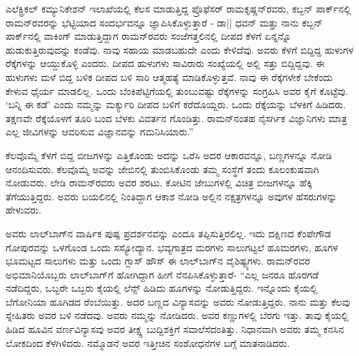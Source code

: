 ಎಲೆಕ್ಟ್ರಿಕಲ್ ಕಮ್ಯುನಿಕೇಶನ್ ಇಲಾಖೆಯಲ್ಲಿ ಕೆಲಸ ಮಾಡುತ್ತಿದ್ದ ಪ್ರೊಫೆಸರ್ ರಾಮಕೃಷ್ಣನ್‌ರವರು, ಕಬ್ಬನ್ ಪಾರ್ಕ್‌ನಲ್ಲಿ ರಾಮನ್‌ರವರನ್ನು ಭೆಟ್ಟಿಯಾದ ಸಂದರ್ಭವನ್ನೂ ಜ್ಞಾಪಿಸಿಕೊಳ್ಳುತ್ತಾರೆ - ಡಾ|| ಧವನ್ ಮತ್ತು ನಾನು ಕಬ್ಬನ್ ಪಾರ್ಕ್‌ನಲ್ಲಿ ವಾಕಿಂಗ್ ಮಾಡುತ್ತಿದ್ದಾಗ ರಾಮನ್‌ರವರು ಸಂಜೆಗತ್ತಲಿನಲ್ಲಿ ದೀಪದ ಕೆಳಗೆ ಏನ್ನನ್ನೊ ಹುಡುಕುತ್ತಿರುವುದನ್ನು ಕಂಡೆವು. ನಾವು ಸಹಾಯ ಮಾಡಬಹುದೇ ಎಂದು ಕೇಳಿದೆವು. ಅವರು ಕೆಳಗೆ ಬಿದ್ದಿದ್ದ ಹುಳುಗಳ ರೆಕ್ಕೆಗಳನ್ನು ಆಯ್ದುಕೊಳ್ಳಿ ಎಂದರು. ದೀಪದ ಹುಳುಗಳು ಸಾವಿರಾರು ಸಂಖ್ಯೆಯಲ್ಲಿ ಅಲ್ಲಿ ಸತ್ತು ಬಿದ್ದಿದ್ದವು. ಈ ಹುಳುಗಳು ಮಳೆ ಬಿದ್ದ ಬಳಿಕ ದೀಪದ ಬಳಿ ಸಾರಿ ಆತ್ಮಹತ್ಯೆ ಮಾಡಿಕೊಳ್ಳುತ್ತವೆ. ನಾವು ಈ ರೆಕ್ಕೆಗಳೇಕೆ ಬೇಕೆಂದು ಕೇಳುವ ಧೈರ್ಯ ಮಾಡಲಿಲ್ಲ. ಒಂದು ಬೆಂಕಿಪೆಟ್ಟಿಗೆಯಲ್ಲಿ ತುಂಬುವಷ್ಟು ರೆಕ್ಕೆಗಳನ್ನು ಸಂಗ್ರಹಿಸಿ ಅವರ ಕೈಗೆ ಕೊಟ್ಟೆವು. ‘ಬನ್ನಿ ಈ ಕಡೆ’ ಎಂದು ನಮ್ಮನ್ನು ಮರ್ಕ್ಯುರಿ ದೀಪದ ಬಳಿಗೆ ಕರೆದೊಯ್ದರು. ಒಂದು ರೆಕ್ಕೆಯನ್ನು ಬೆಳಕಿಗೆ ಹಿಡಿದರು. ತಕ್ಷಣವೇ ರೆಕ್ಕೆಯೊಳಗೆ ತೂರಿ ಬಂದ ಬೆಳಕು ವಿವರ್ತನ ಗೊಂಡಿತ್ತು. ರಾಮನ್‌ನಂತಹ ನೈಸರ್ಗಿಕ ವಿಜ್ಞಾನಿಗಳು ಮಾತ್ರ ಎಲ್ಲ ಜೀವಿಗಳನ್ನು ಆವರಿಸುವ ವಿಜ್ಞಾನವನ್ನು ಗಮನಿಸಿಯಾರು.” 

ಕೆಲವೊಮ್ಮೆ ಕೆಳಗೆ ಬಿದ್ದ ಬೀಜಗಳನ್ನು ಎತ್ತಿಕೊಂಡು ಅದನ್ನು ಒರೆಸಿ ಅದರ ಆಕಾರವನ್ನೂ, ಬಣ್ಣಗಳನ್ನೂ ನೋಡಿ ಆನಂದಿಸುವರು. ಕೆಲವೊಮ್ಮೆ ಅವನ್ನು ಜೇಬಿನಲ್ಲಿ ತುಂಬಿಸಿಕೊಂಡು ತಮ್ಮ ಸಂಸ್ಥೆಗೆ ತಂದು ಕೂಲಂಕುಷವಾಗಿ ನೋಡುವರು. ಲೇಡಿ ರಾಮನ್‌ರವರು ಅವರ ಶರಟು, ಕೋಟಿನ ಜೇಬುಗಳಲ್ಲಿ ವಿಚಿತ್ರ ಬೀಜಗಳನ್ನೂ ಹೆಕ್ಕಿ ತೆಗೆಯುತ್ತಿದ್ದರು. ಅವರು ಬಯಲಿನಲ್ಲಿ ನಿಂತಿದ್ದಾಗ ಆಕಾಶ ನೋಡಿ ಅಲ್ಲಿನ ನಕ್ಷತ್ರಗಳನ್ನೂ ಅವುಗಳ ಹೆಸರುಗಳನ್ನು ಹೇಳುವರು. 

ಅವರು ಲಾಲ್‌ಬಾಗ್‍ನ ವಾರ್ಷಿಕ ಪುಷ್ಪ ಪ್ರದರ್ಶನವನ್ನು ಎಂದೂ ತಪ್ಪಿಸುತ್ತಿರಲಿಲ್ಲ. ಇದು ದಕ್ಷಿಣದ ಕೆಂಪೇಗೌಡ ಗೋಪುರವನ್ನು ಒಳಗೊಂಡ ಒಂದು ಸಸ್ಯೋದ್ಯಾನ. ಭವ್ಯಗಾತ್ರದ ಮರಗಳು ಸಾಲುಗಟ್ಟಲೆ ಹೂಮರಗಳು, ಹೂಗಳ ಭೂಮಟ್ಟದ ಸಾಲುಗಳು ಮತ್ತು ಒಂದು ಗ್ಲಾಸ್ ಹೌಸ್ ಈ ಲಾಲ್‌ಬಾಗ್‍‌ನ ವೈಶಿಷ್ಟ್ಯಗಳು. ರಾಮನ್‌ರವರ ಅಭಿಮಾನಿಯೊಬ್ಬರು ಲಾಲ್‌ಬಾಗ್‌ಗೆ ಹೋಗಿದ್ದಾಗ ಹೀಗೆ ನೆನಪಿಸಿಕೊಳ್ಳುತ್ತಾರೆ- “ಎಲ್ಲ ಜನರೂ ಹೊರಗಡೆ ನಡೆದಿದ್ದರು, ಒಬ್ಬರೇ ಒಬ್ಬರು ಕೈಯಲ್ಲಿ ಲೆನ್ಸ್ ಹಿಡಿದು ಹೂಗಳನ್ನು ನೋಡುತ್ತಿದ್ದರು. ಇನ್ನೊಂದು ಕೈಯಲ್ಲಿ ಬೆಗೋನಿಯಾ ಹೂಗಿಡದ ರೆಂಬೆಯಿತ್ತು. ಅದರ ಬಣ್ಣದ ವಿನ್ಯಾಸವನ್ನು ಅವರು ನೋಡುತ್ತಿದ್ದರು. ನಾನು ಮತ್ತು ಕೆಲವು ಸ್ನೇಹಿತರು ಅವರ ಬಳಿ ನಡೆದವು. ಅವರು ನಮ್ಮನ್ನು ನೋಡಿದರು. ಅವರ ಕಣ್ಣುಗಳಲ್ಲಿ ಬೆರಗು ಇತ್ತು. ತಾವು ಕೈಯಲ್ಲಿ ಹಿಡಿದ ಹೂವಿನ ವರ್ಣವಿನ್ಯಾಸವು ಅವರ ತೀಕ್ಷ್ಣ ಬುದ್ದಿಶಕ್ತಿಗೆ ಸವಾಲೆಸೆದಂತಿತ್ತು. ನಿಧಾನವಾಗಿ ಅವರು ತಮ್ಮ ಕನಸಿನ ಲೋಕದಿಂದ ಕೆಳಗಿಳಿದರು. ನಮ್ಮೊಡನೆ ಅವರ ಇತ್ತೀಚಿನ ಸಂಶೋಧನೆಗಳ ಬಗ್ಗೆ ಮಾತನಾಡಿದರು. 

